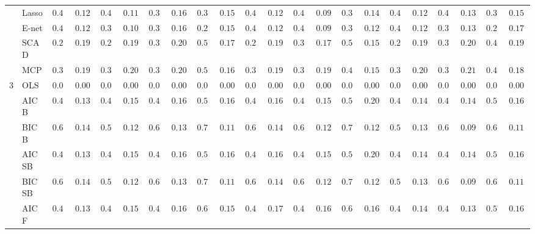 \begin{tabular}{p{0.2cm}p{1cm}|p{0.6cm}p{0.6cm}|p{0.6cm}p{0.6cm}p{0.6cm}p{0.6cm}p{0.6cm}p{0.6cm}|p{0.6cm}p{0.6cm}p{0.6cm}p{0.6cm}p{0.6cm}p{0.6cm}|p{0.6cm}p{0.6cm}p{0.6cm}p{0.6cm}p{0.6cm}p{0.6cm}}
 & Lasso  & $0.480$ & $0.1239$ & $0.418$ & $0.1140$ & $0.370$ & $0.1642$ & $0.378$ & $0.1554$ & $0.460$ & $0.1255$ & $0.440$ & $0.0985$ & $0.386$ & $0.1457$ & $0.466$ & $0.1273$ & $0.426$ & $0.1383$ & $0.388$ & $0.1578$ \\
 & E-net  & $0.456$ & $0.1242$ & $0.396$ & $0.1063$ & $0.338$ & $0.1625$ & $0.282$ & $0.1533$ & $0.452$ & $0.1259$ & $0.434$ & $0.0945$ & $0.310$ & $0.1251$ & $0.448$ & $0.1210$ & $0.394$ & $0.1377$ & $0.276$ & $0.1793$ \\
 & SCAD  & $0.266$ & $0.1950$ & $0.284$ & $0.1994$ & $0.346$ & $0.2086$ & $0.500$ & $0.1741$ & $0.294$ & $0.1958$ & $0.336$ & $0.1773$ & $0.502$ & $0.1595$ & $0.294$ & $0.1979$ & $0.322$ & $0.2008$ & $0.482$ & $0.1930$ \\
 & MCP  & $0.306$ & $0.1999$ & $0.328$ & $0.2021$ & $0.376$ & $0.2036$ & $0.508$ & $0.1643$ & $0.324$ & $0.1985$ & $0.376$ & $0.1975$ & $0.486$ & $0.1589$ & $0.334$ & $0.2071$ & $0.358$ & $0.2189$ & $0.496$ & $0.1809$ \\\hline
3 & OLS  & $0.000$ & $0.0000$ & $0.000$ & $0.0000$ & $0.000$ & $0.0000$ & $0.000$ & $0.0000$ & $0.000$ & $0.0000$ & $0.000$ & $0.0000$ & $0.000$ & $0.0000$ & $0.000$ & $0.0000$ & $0.000$ & $0.0000$ & $0.000$ & $0.0000$ \\
 & AIC B  & $0.428$ & $0.1364$ & $0.452$ & $0.1521$ & $0.480$ & $0.1633$ & $0.588$ & $0.1677$ & $0.412$ & $0.1653$ & $0.464$ & $0.1554$ & $0.580$ & $0.2020$ & $0.432$ & $0.1497$ & $0.474$ & $0.1468$ & $0.562$ & $0.1698$ \\
 & BIC B  & $0.608$ & $0.1447$ & $0.586$ & $0.1279$ & $0.628$ & $0.1393$ & $0.708$ & $0.1152$ & $0.626$ & $0.1411$ & $0.642$ & $0.1281$ & $0.720$ & $0.1239$ & $0.596$ & $0.1333$ & $0.622$ & $0.0980$ & $0.656$ & $0.1104$ \\
 & AIC SB  & $0.428$ & $0.1364$ & $0.452$ & $0.1521$ & $0.480$ & $0.1633$ & $0.588$ & $0.1677$ & $0.412$ & $0.1653$ & $0.464$ & $0.1554$ & $0.580$ & $0.2020$ & $0.432$ & $0.1497$ & $0.474$ & $0.1468$ & $0.562$ & $0.1698$ \\
 & BIC SB  & $0.608$ & $0.1447$ & $0.586$ & $0.1279$ & $0.628$ & $0.1393$ & $0.708$ & $0.1152$ & $0.626$ & $0.1411$ & $0.642$ & $0.1281$ & $0.718$ & $0.1242$ & $0.596$ & $0.1333$ & $0.622$ & $0.0980$ & $0.656$ & $0.1104$ \\
 & AIC F  & $0.432$ & $0.1355$ & $0.454$ & $0.1527$ & $0.496$ & $0.1669$ & $0.614$ & $0.1589$ & $0.432$ & $0.1746$ & $0.494$ & $0.1644$ & $0.654$ & $0.1604$ & $0.432$ & $0.1497$ & $0.498$ & $0.1318$ & $0.586$ & $0.1664$ \\

\end{tabular}
